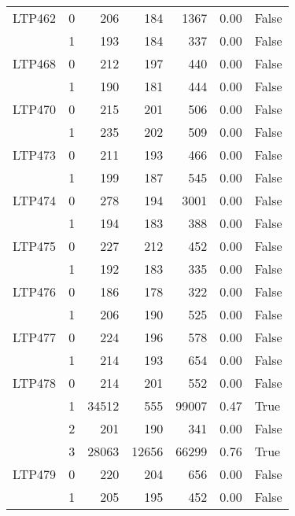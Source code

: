 \begin{longtable}{llrrrrl}
\bottomrule
\endlastfoot
LTP462 & 0 &                      206 &    184 &    1367 &     0.00 &    False \\
       & 1 &                      193 &    184 &     337 &     0.00 &    False \\
LTP468 & 0 &                      212 &    197 &     440 &     0.00 &    False \\
       & 1 &                      190 &    181 &     444 &     0.00 &    False \\
LTP470 & 0 &                      215 &    201 &     506 &     0.00 &    False \\
       & 1 &                      235 &    202 &     509 &     0.00 &    False \\
LTP473 & 0 &                      211 &    193 &     466 &     0.00 &    False \\
       & 1 &                      199 &    187 &     545 &     0.00 &    False \\
LTP474 & 0 &                      278 &    194 &    3001 &     0.00 &    False \\
       & 1 &                      194 &    183 &     388 &     0.00 &    False \\
LTP475 & 0 &                      227 &    212 &     452 &     0.00 &    False \\
       & 1 &                      192 &    183 &     335 &     0.00 &    False \\
LTP476 & 0 &                      186 &    178 &     322 &     0.00 &    False \\
       & 1 &                      206 &    190 &     525 &     0.00 &    False \\
LTP477 & 0 &                      224 &    196 &     578 &     0.00 &    False \\
       & 1 &                      214 &    193 &     654 &     0.00 &    False \\
LTP478 & 0 &                      214 &    201 &     552 &     0.00 &    False \\
       & 1 &                    34512 &    555 &   99007 &     0.47 &     True \\
       & 2 &                      201 &    190 &     341 &     0.00 &    False \\
       & 3 &                    28063 &  12656 &   66299 &     0.76 &     True \\
LTP479 & 0 &                      220 &    204 &     656 &     0.00 &    False \\
       & 1 &                      205 &    195 &     452 &     0.00 &    False \\

\end{longtable}
